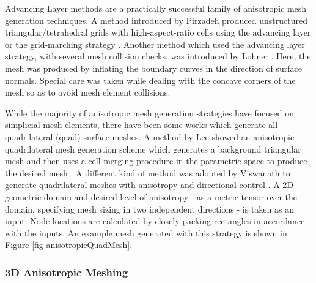 Advancing Layer methods are a practically successful family of anisotropic mesh generation techniques. A method introduced by Pirzadeh produced unstructured triangular/tetrahedral grids with high-aspect-ratio cells using the advancing layer or the grid-marching strategy \cite{pirzadeh1994unstructured}. Another method which used the advancing layer strategy, with several mesh collision checks, was introduced by Lohner \cite{lohner1993matching}. Here, the mesh was produced by inflating the boundary curves in the direction of surface normals. Special care was taken while dealing with the concave corners of the mesh so as to avoid mesh element collisions.



While the majority of anisotropic mesh generation strategies have focused on simplicial mesh elements, there have been some works which generate all quadrilateral (quad) surface meshes. A method by Lee \etal showed an anisotropic quadrilateral mesh generation scheme which generates a background triangular mesh and then uses a cell merging procedure in the parametric space to produce the desired mesh \cite{lee2003new}. A different kind of method was adopted by Viswanath \etal to generate quadrilateral meshes with anisotropy and directional control \cite{viswanath2000quadrilateral}. A 2D geometric domain and desired level of anisotropy - as a metric tensor over the domain, specifying mesh sizing in two independent directions - is taken as an input. Node locations are calculated by closely packing rectangles in accordance with the inputs. An example mesh generated with this strategy is shown in Figure \ref{fig-anisotropicQuadMesh}.

\subsubsection{3D Anisotropic Meshing}
\label{sec-3D}

